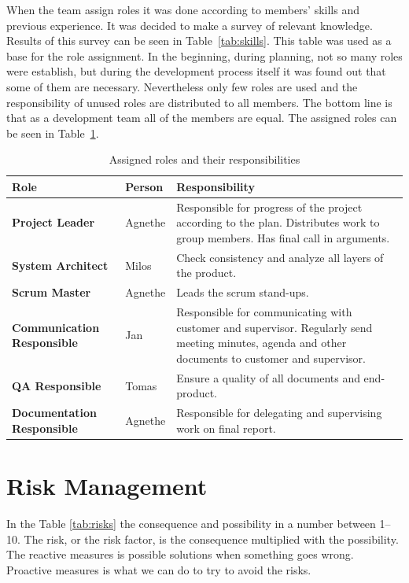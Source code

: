 When the team assign roles it was done according to members' skills and previous experience. 
It was decided to make a survey of relevant knowledge. 
Results of this survey can be seen in Table~\ref{tab:skills}. 
This table was used as a base for the role assignment.
In the beginning, during planning, not so many roles were establish, but during the development process itself it was found out that some of them are necessary. 
Nevertheless only few roles are used and the responsibility of unused roles are distributed to all members. 
The bottom line is that as a development team all of the members are equal.
The assigned roles can be seen in Table~\ref{tab:roles}. 

\begin{table}\centering {}
    \caption{Assigned roles and their responsibilities}
    \label{tab:roles}
    \vspace{2mm}
    \begin{tabularx}{\textwidth}{llX}
    \toprule[0.5mm]
    Role    & Person   & Responsibility \\
    \midrule
    \textbf{Project Leader}             & Agnethe &
        Responsible for progress of the project according to the plan.
        Distributes work to group members.
        Has final call in arguments.\\
    \textbf{System Architect}             & Milos &
        Check consistency and analyze all layers of the product. \\
    \textbf{Scrum Master}             & Agnethe &
        Leads the scrum stand-ups. \\
    \textbf{Communication Responsible}  & Jan &
        Responsible for communicating with customer and supervisor.
        Regularly send meeting minutes, agenda and other documents to customer and supervisor. \\ 
    \textbf{QA Responsible} & Tomas &
        Ensure a quality of all documents and end-product.        \\ 
    \textbf{Documentation Responsible} & Agnethe &
        Responsible for delegating and supervising work on final report.        \\         
    \bottomrule[0.5mm]
    \end{tabularx}
\end{table}

\section{Risk Management}
In the Table \ref{tab:risks} the consequence and possibility in a number between 1--10. The risk, or the risk factor, is the consequence multiplied with the possibility. The reactive measures is possible solutions when something goes wrong. Proactive measures is what we can do to try to avoid the risks.  

